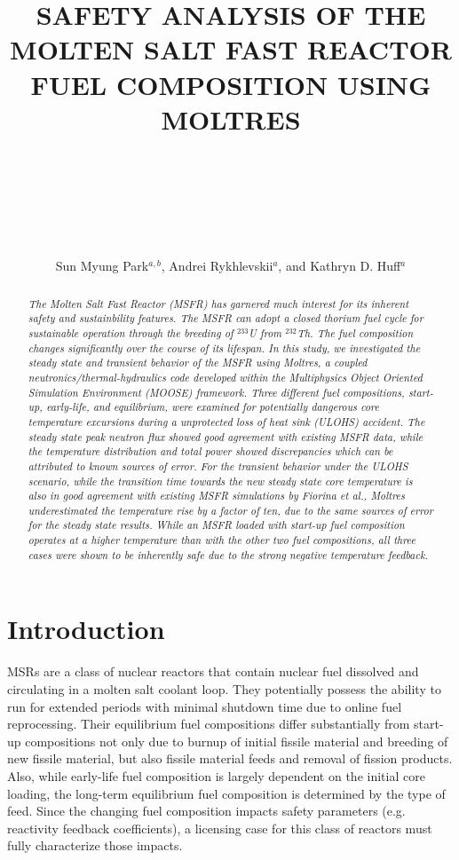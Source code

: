 \documentclass{anstrans}
\title{SAFETY ANALYSIS OF THE MOLTEN SALT FAST REACTOR FUEL COMPOSITION USING
MOLTRES \\~\\~\\~\\}
\author{Sun Myung Park$^{a,b}$, Andrei Rykhlevskii$^a$, and
Kathryn D. Huff$^a$}
\institute{$^a$Dept. of Nuclear, Plasma and Radiological Engineering,
University of Illinois at Urbana-Champaign \\
$^b$smpark3@illinois.edu}
\begin{document}
\begin{abstract}
%
\textit{
    The Molten
    Salt Fast Reactor (MSFR) has garnered much interest for its inherent
    safety and sustainbility features. The MSFR can adopt a closed thorium fuel
    cycle for
    sustainable operation through the breeding of $^{233}$U from $^{232}$Th.
    The fuel composition changes significantly over the course of its lifespan.
    In this study, we investigated the steady state and transient behavior of
    the MSFR using Moltres, a coupled neutronics/thermal-hydraulics code
    developed within the Multiphysics Object Oriented Simulation Environment
    (MOOSE) framework. Three different fuel compositions, start-up,
    early-life, and equilibrium, were examined for potentially
    dangerous
    core temperature excursions during a unprotected loss of heat sink (ULOHS)
    accident. The steady state peak neutron flux showed good agreement
    with existing MSFR data, while the temperature distribution and total power
    showed discrepancies which can be attributed to known sources of error.
    For the transient behavior under the ULOHS
    scenario, while the transition time towards the new steady state core
    temperature is also in good agreement with existing MSFR simulations by
    Fiorina et al., Moltres underestimated the
    temperature rise by a factor of ten, due to the same sources of
    error for the steady state results. While an MSFR loaded with
    start-up fuel composition operates at a higher temperature than with the
    other two fuel compositions, all three cases were shown to be inherently
    safe due to the strong negative temperature feedback.
}
\end{abstract}

\section{Introduction}

	\glspl{MSR} are a class of nuclear reactors that
	contain nuclear fuel dissolved and circulating in a molten salt coolant
	loop.
	They potentially possess the ability to run for extended 
    periods with minimal shutdown time due to online fuel reprocessing.
    Their equilibrium fuel compositions differ substantially from
    start-up compositions not only due to burnup of initial fissile material
    and breeding of new fissile material, but also fissile material feeds and 
    removal of fission products. Also, while early-life fuel composition is
    largely dependent on the initial core loading, the long-term equilibrium
    fuel composition is determined by the type of feed.
    Since the changing fuel composition 
    impacts safety parameters (e.g. reactivity feedback coefficients), a 
    licensing case for this class of reactors  must fully characterize 
    those impacts.
\end{document}
